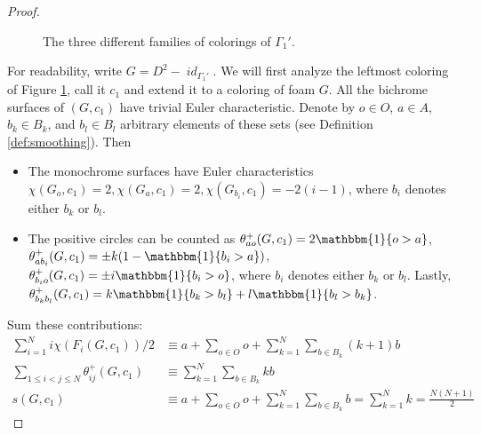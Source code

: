 \documentclass[12pt]{amsart}
\theoremstyle{definition}
\theoremstyle{remark}
\numberwithin{equation}{section}
\numberwithin{figure}{section}
\DeclareMathOperator{\idfoam}{\mathit{id}}
\begin{document}
\begin{proof}
\begin{figure}[htbp]
\caption{The three different families of colorings of $\Gamma_1'$.}
\label{fig:colorings of Gamma1'}
\end{figure}

For readability, write $G = D^2 -  \idfoam_{\Gamma_1'}$. We will first analyze the leftmost coloring of Figure \ref{fig:colorings of Gamma1'}, call it $c_1$ and extend it to a coloring of foam $G$. All the bichrome surfaces of $(G, c_1)$ have trivial Euler characteristic. Denote by $o\in O$, $a\in A$, $b_k\in B_k$, and $b_l\in B_l$ arbitrary elements of these sets (see Definition \ref{def:smoothing}). Then
  \begin{itemize}
    \item The monochrome surfaces have Euler characteristics $\chi(G_{o}, c_1)=2, \chi(G_a, c_1) = 2, \chi(G_{b_i}, c_1) = -2(i-1)$, where $b_i$ denotes either $b_k$ or $b_l$.
    \item The positive circles can be counted as $\theta^+_{ao}(G, c_1) = 2\mathbbm{1}\{o > a\}$, $\theta^+_{ab_i}(G, c_1) = \pm k (1 - \mathbbm{1}\{b_i > a\})$, $\theta^+_{b_i o}(G, c_1) = \pm i  \mathbbm{1}\{b_i > o\}$, where $b_i$ denotes either $b_k$ or $b_l$. Lastly, $\theta^+_{b_k b_l}(G, c_1) = k \mathbbm{1}\{b_k > b_l\} +  l \mathbbm{1}\{b_l > b_k\}$.
  \end{itemize}
  Sum these contributions:
  \begin{align*}
    \sum_{i=1}^N {i \chi(F_i(G,c_1))/2}  &\equiv a + \sum_{o \in O} o + \sum_{k = 1}^N\sum_{b \in B_k} (k+1) b \\
    \sum_{1\leq i < j \leq N} \theta^+_{ij}(G,c_1) & \equiv \sum_{k = 1}^N\sum_{b \in B_k} k b \\
    s(G,c_1) &\equiv  a + \sum_{o \in O} o  + \sum_{k = 1}^N\sum_{b \in B_k}  b  = \sum_{k = 1}^N k = \frac{N(N+1)}{2}
  \end{align*}


\end{proof}
\end{document}
